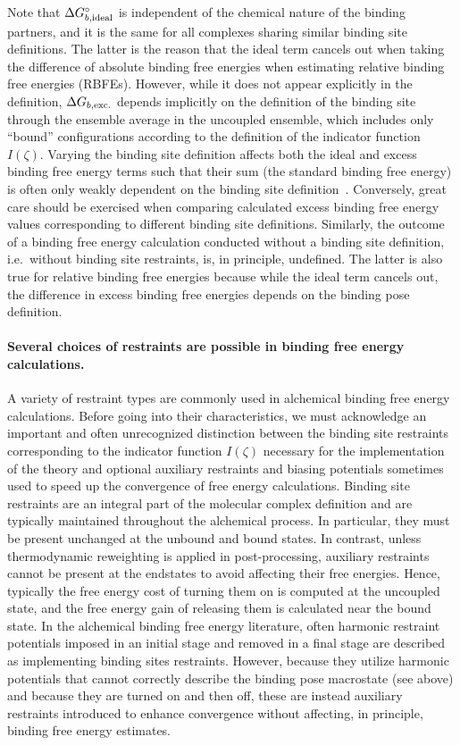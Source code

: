 \documentclass[9pt,bestpractices]{livecoms}
\begin{document}
Note that $\Delta G^\circ_{b,{\rm ideal}}$ is independent of the chemical nature of the binding partners, and it is the same for all complexes sharing similar binding site definitions. The latter is the reason that the ideal term cancels out when taking the difference of absolute binding free energies when estimating relative binding free energies (RBFEs). However, while it does not appear explicitly in the definition, $\Delta G_{b,{\rm exc.}}$ depends implicitly on the definition of the binding site through the ensemble average in the uncoupled ensemble, which includes only ``bound'' configurations according to the definition of the indicator function $I(\zeta)$. Varying the binding site definition affects both the ideal and excess binding free energy terms such that their sum (the standard binding free energy) is often only weakly dependent on the binding site definition~\cite{gilson1997statisticalthermodynamic,gallicchio2011recent}. Conversely, great care should be exercised when comparing calculated excess binding free energy values corresponding to different binding site definitions. Similarly, the outcome of a binding free energy calculation conducted without a binding site definition, i.e.\ without binding site restraints, is, in principle, undefined. The latter is also true for relative binding free energies because while the ideal term cancels out, the difference in excess binding free energies depends on the binding pose definition. 

\paragraph{Several choices of restraints are possible in binding free energy calculations.}
A variety of restraint types are commonly used in alchemical binding free energy calculations. Before going into their characteristics, we must acknowledge an important and often unrecognized distinction between the binding site restraints corresponding to the indicator function $I(\zeta)$ necessary for the implementation of the theory and optional auxiliary restraints and biasing potentials sometimes used to speed up the convergence of free energy calculations. Binding site restraints are an integral part of the molecular complex definition and are typically maintained throughout the alchemical process. In particular, they must be present unchanged at the unbound and bound states. In contrast, unless thermodynamic reweighting is applied in post-processing, auxiliary restraints cannot be present at the endstates to avoid affecting their free energies. Hence, typically the free energy cost of turning them on is computed at the uncoupled state, and the free energy gain of releasing them is calculated near the bound state. In the alchemical binding free energy literature, often harmonic restraint potentials imposed in an initial stage and removed in a final stage are described as implementing binding sites restraints. However, because they utilize harmonic potentials that cannot correctly describe the binding pose macrostate (see above) and because they are turned on and then off, these are instead auxiliary restraints introduced to enhance convergence without affecting, in principle, binding free energy estimates.
\end{document}
